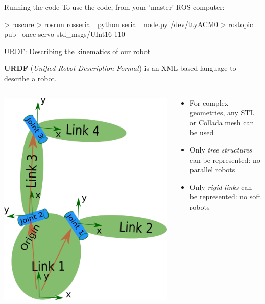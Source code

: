 \documentclass[compress]{beamer}
\begin{document}
\begin{frame}[fragile]{Running the code}
    To use the code, from your 'master' ROS computer:

\begin{shcode}
> roscore
> rosrun rosserial_python serial_node.py /dev/ttyACM0
> rostopic pub --once servo std_msgs/UInt16 110
\end{shcode}
\end{frame}


\begin{frame}[fragile]{URDF: Describing the kinematics of our robot}

    \begin{overprint}
        \textbf{URDF} (\emph{Unified Robot Description Format}) is an XML-based language
        to describe a robot.

        \begin{columns}
            \begin{column}{0.5\linewidth}
        \begin{center}
            \includegraphics[width=0.8\linewidth]{link}
        \end{center}
                
            \end{column}
            \begin{column}{0.5\linewidth}
        \begin{itemize}
                \small
            \item For complex geometries, any STL or Collada mesh can be used
            \item Only \emph{tree structures} can be represented: no parallel robots
            \item Only \emph{rigid links} can be represented: no soft robots
        \end{itemize}
            \end{column}
        \end{columns}




\end{overprint}
\end{frame}
\end{document}
